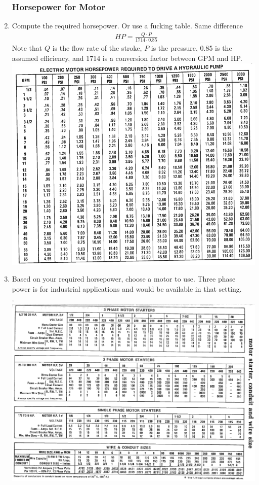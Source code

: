 \documentclass[11pt, fleqn]{article}
\begin{document}
\begin{enumerate}
\subsubsection{Horsepower for Motor}
    \item Compute the required horsepower. Or use a fucking table. Same difference
    \begin{align*}
        &HP=\frac{Q\cdot P}{1714\cdot0.85}
    \end{align*}
    Note that $Q$ is the flow rate of the stroke, $P$ is the pressure, 0.85 is the assumed efficiency, and 1714 is a conversion factor between GPM and HP.\\
    \includegraphics[scale=1]{Fluids/tabC1.png}
    
    \item Based on your required horsepower, choose a motor to use.  Three phase power is for industrial applications and would be available in that setting.\\
    .\hspace{-2.5cm}\includegraphics[scale=0.9]{Fluids/tabC3.png}
\end{enumerate}
\end{document}
